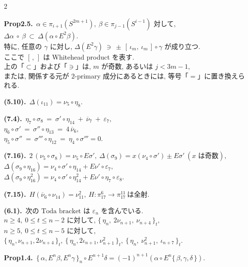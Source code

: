 \documentclass[10pt, leqno]{ltjsarticle}
\newcommand{\ov}[1]{\overline{#1}}
\newcommand{\toda}[1]{\{\,#1\,\}}              %
\newcommand{\todai}[2][]{\{\,#2\,\}_{#1}}      %
\newcommand{\pit}[2]{\pi_{#1}^{#2}}
\numberwithin{equation}{section}
\theoremstyle{plain}
\theoremstyle{definition}
\theoremstyle{remark}
\begin{document}
\begin{paracol}{2}
\switchcolumn

\noindent
\textbf{Prop2.5.}\
$\alpha\in\pi_{i+1}(S^{2m+1}), \ \beta\in \pi_{j-1}(S^{i-1})$ 対して, 
\(
\Delta\alpha\ \circ\ \beta\ \subset\ \Delta(\alpha\circ E^2\beta).
\)\\
特に, 任意の $\gamma$ に対し,
\(
\Delta(E^2\gamma)\ \ni\ \pm\,[\,\iota_m,\ \iota_m\,]\circ\gamma
\)
が成り立つ. \\
ここで $[\, ,\,]$ は Whitehead product を表す. \\
上の「$\subset$」および「$\ni$」は, $m$ が奇数, 
あるいは $j<3m-1$, \\
または, 関係する元が \(2\)-primary 成分にあるときには, 
等号「$=$」に置き換えられる. 

\noindent
\textbf{(5.10).}\
\(\Delta(\iota_{11})=\nu_5\circ\eta_8 .\)

\noindent
\textbf{(7.4).}\
\(\eta_{7}\circ\sigma_{8}\ =\ \sigma'\circ\eta_{14}\ +\ \ov{\nu}_{7}\ +\ \varepsilon_{7},\) \\
\(\eta_{6}\circ\sigma'\ =\ \sigma''\circ\eta_{13}\ =\ 4\,\ov{\nu}_{6}, \)\\
\(\eta_5\circ\sigma'' \ =\ \sigma'''\circ\eta_{12}\ =\ \eta_4\circ\sigma''' = 0. \)

\noindent
\textbf{(7.16).}\
\(2\,(\nu_{5}\circ\sigma_{8}) = \nu_{5}\circ E\sigma',\
\Delta(\sigma_{9}) = x(\nu_{4}\circ\sigma') \pm E\sigma'
\ (\text{$x$ は奇数}),\)\\
\(\Delta(\sigma_{9}\circ\eta_{16}) 
= \nu_{4}\circ\sigma'\circ\eta_{14} + E\nu'\circ\varepsilon_{7},\)\\
\(\Delta(\sigma_9\circ\eta_{16}^2) = \nu_4\circ\sigma'\circ\eta_{14}^2
+ E\nu'\circ\eta_7\circ\varepsilon_8. \)

\noindent
\textbf{(7.15).}\
\(H(\ov{\nu}_{6}\circ \nu_{14})=\nu_{11}^{2},\
H:\pit{17}{6}\longrightarrow \pit{17}{11}\ \text{は全射}.\)

\noindent
\textbf{(6.1).}\ 
\(\text{次の Toda bracket は } \varepsilon_n \text{ を含んでいる. }\quad\)\\
\(n\ge4,\ 0\le t\le n-2\) に対して, 
\(
\todai[t]{\eta_n,\ 2\nu_{n+1},\ \nu_{n+4}},
\)\\
\(n\ge5,\ 0\le t\le n-5\) に対して, \\
\(
\todai[t]{\eta_n, \nu_{n+1}, 2\nu_{n+4}},\
\todai[t]{\eta_n, 2\iota_{n+1}, \nu_{n+1}^2},\
\todai[t]{\eta_n,\ \nu_{n+1}^{2},\ \iota_{n+7}} .
\)

\noindent
\textbf{Prop1.4.}\
\(\todai[n]{\alpha, E^n\beta, E^n\gamma}\circ E^{n+1}\delta
= (-1)^{n+1}(\alpha\circ E^n\toda{\beta, \gamma, \delta})\).


\end{paracol}
\end{document}
